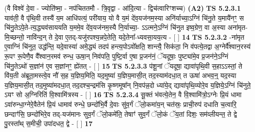\documentclass[17pt]{extarticle}
\begin{document}
                  \newline
                      (वै विश्वे॑ दे॒वा - ज्योति॑ष्मा॒ - नप॑चिततमौ - त्रि॒वृद्वा - आ॑दि॒त्या - द्विच॑त्वारिꣳशच्च)  \textbf{(A2)} \newline \newline
                                        \textbf{ TS 5.2.3.1} \newline
                  याव॑ती॒ वै पृ॑थि॒वी तस्यै॑ य॒म आधि॑पत्यं॒ परी॑याय॒ यो वै य॒मं दे॑व॒यज॑नम॒स्या अनि॑र्याच्या॒ऽग्निं चि॑नु॒ते य॒मायै॑नꣳ॒॒ स चि॑नु॒तेऽपे॒ते-त्य॒द्ध्यव॑साययति य॒ममे॒व दे॑व॒यज॑नम॒स्यै नि॒र्याच्या॒- ऽऽत्मने॒ऽग्निं चि॑नुत इष्व॒ग्रेण॒ वा अ॒स्या अना॑मृत-मि॒च्छन्तो॒ नावि॑न्द॒न् ते दे॒वा ए॒तद्-यजु॑रपश्य॒न्नपे॒तेति॒ यदे॒तेना᳚-ध्यवसा॒यय॒त्य - [  ] \textbf{  14} \newline
                  \newline
                                \textbf{ TS 5.2.3.2} \newline
                  -ना॑मृत ए॒वाग्निं चि॑नुत॒ उद्ध॑न्ति॒ यदे॒वास्या॑ अमे॒द्ध्यं तदप॑ हन्त्य॒पोऽवो᳚क्षति॒ शान्त्यै॒ सिक॑ता॒ नि व॑पत्ये॒तद्वा अ॒ग्नेर्वै᳚श्वान॒रस्य॑ रू॒पꣳ रू॒पेणै॒व वै᳚श्वान॒रमव॑ रुन्ध॒ ऊषा॒न् निव॑पति॒ पुष्टि॒र्वा ए॒षा प्र॒जन॑नं॒ ॅयदूषाः॒ पुष्ट्या॑मे॒व प्र॒जन॑ने॒ऽग्निं चि॑नु॒तेऽथो॑ स॒ज्ञांन॑ ए॒व स॒ज्ञांनꣳ॒॒ ह्ये॑तत् - [  ] \textbf{  15} \newline
                  \newline
                                \textbf{ TS 5.2.3.3} \newline
                  प॑शू॒नां ॅयदूषा॒ द्यावा॑पृथि॒वी स॒हाऽऽस्तां॒ ते वि॑य॒ती अ॑ब्रूता॒मस्त्वे॒व नौ॑ स॒ह य॒ज्ञिय॒मिति॒ यद॒मुष्या॑ य॒ज्ञिय॒मासी॒त् तद॒स्याम॑दधा॒त् त ऊषा॑ अभव॒न्॒ यद॒स्या य॒ज्ञिय॒मासी॒त् तद॒मुष्या॑मदधा॒त् तद॒दश्च॒न्द्रम॑सि कृ॒ष्णमूषा᳚न् नि॒वप॑न्न॒दो ध्या॑ये॒द् द्यावा॑पृथि॒व्योरे॒व य॒ज्ञिये॒ऽग्निं चि॑नुते॒ ऽयꣳ सो अ॒ग्निरिति॑ वि॒श्वामि॑त्रस्य - [  ] \textbf{  16} \newline
                  \newline
                                \textbf{ TS 5.2.3.4} \newline
                  सू॒क्तं भ॑वत्ये॒तेन॒ वै वि॒श्वामि॑त्रो॒ऽग्नेः प्रि॒यं धामा ऽवा॑रुन्धा॒ग्नेरे॒वैतेन॑ प्रि॒यं धामाव॑ रुन्धे॒ छन्दो॑भि॒र्वै दे॒वाः सु॑व॒र्गं ॅलो॒कमा॑य॒न् चत॑स्रः॒ प्राची॒रुप॑ दधाति च॒त्वारि॒ छन्दाꣳ॑सि॒ छन्दो॑भिरे॒व तद्-यज॑मानः सुव॒र्गं ॅलो॒कमे॑ति॒ तेषाꣳ॑ सुव॒र्गं ॅलो॒कं ॅय॒तां दिशः॒ सम॑व्लीयन्त॒ ते द्वे पु॒रस्ता᳚थ् स॒मीची॒ उपा॑दधत॒ द्वे - [  ] \textbf{  17} \newline
                  \newline
\end{document}
